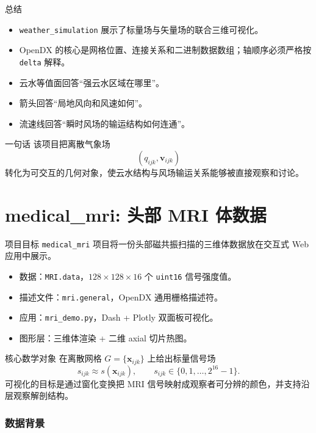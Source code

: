 \documentclass[aspectratio=169,11pt]{ctexbeamer}
\newcommand{\vx}{\mathbf x}
\newcommand{\vv}{\mathbf v}
\begin{document}
\begin{frame}{总结}
  \begin{itemize}
    \item \texttt{weather\_simulation} 展示了标量场与矢量场的联合三维可视化。
    \item OpenDX 的核心是网格位置、连接关系和二进制数据数组；轴顺序必须严格按 \texttt{delta} 解释。
    \item 云水等值面回答“强云水区域在哪里”。
    \item 箭头回答“局地风向和风速如何”。
    \item 流速线回答“瞬时风场的输运结构如何连通”。
  \end{itemize}

  \begin{block}{一句话}
    该项目把离散气象场
    \[
      (q_{ijk},\vv_{ijk})
    \]
    转化为可交互的几何对象，使云水结构与风场输运关系能够被直接观察和讨论。
  \end{block}
\end{frame}

\part{medical\_mri: 头部 MRI 体数据}

\begin{frame}{项目目标}
  \texttt{medical\_mri} 项目将一份头部磁共振扫描的三维体数据放在交互式 Web 应用中展示。

  \begin{itemize}
    \item 数据：\texttt{MRI.data}，$128\times 128\times 16$ 个 \texttt{uint16} 信号强度值。
    \item 描述文件：\texttt{mri.general}，OpenDX 通用栅格描述符。
    \item 应用：\texttt{mri\_demo.py}，Dash + Plotly 双面板可视化。
    \item 图形层：三维体渲染 + 二维 axial 切片热图。
  \end{itemize}

  \begin{block}{核心数学对象}
    在离散网格 $G=\{\vx_{ijk}\}$ 上给出标量信号场
    \[
      s_{ijk}\approx s(\vx_{ijk}),\qquad
      s_{ijk}\in\{0,1,\dots,2^{16}-1\}.
    \]
    可视化的目标是通过窗化变换把 MRI 信号映射成观察者可分辨的颜色，并支持沿层观察解剖结构。
  \end{block}
\end{frame}

\section{数据背景}
\end{document}
